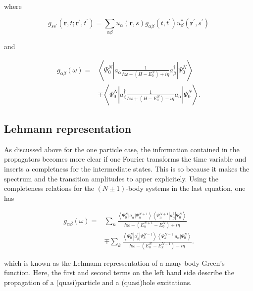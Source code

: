 {{where

$$
g_{s s^{\prime}}\left(\mathbf{r}, t ; \mathbf{r}^{\prime}, t^{\prime}\right)=\sum_{\alpha \beta} u_{\alpha}(\mathbf{r}, s) g_{\alpha \beta}\left(t, t^{\prime}\right) u_{\beta}^{*}\left(\mathbf{r}^{\prime}, s^{\prime}\right)
$$

and

$$
\begin{aligned}
g_{\alpha \beta}(\omega)= & \left\langle\Psi_{0}^{N}\left|a_{\alpha} \frac{1}{\hbar \omega-\left(H-E_{0}^{N}\right)+i \eta} a_{\beta}^{\dagger}\right| \Psi_{0}^{N}\right\rangle \\
& \mp\left\langle\Psi_{0}^{N}\left|a_{\beta}^{\dagger} \frac{1}{\hbar \omega+\left(H-E_{0}^{N}\right)-i \eta} a_{\alpha}\right| \Psi_{0}^{N}\right\rangle .
\end{aligned}
$$

\subsection{Lehmann representation}

As discussed above for the one particle case, the information
contained in the propagators becomes more clear if one Fourier
transforms the time variable and inserts a completness for the
intermediate states. This is so because it makes the spectrum and the
transition amplitudes to apper explicitely. Using the completeness
relations for the $(N \pm 1)$-body systems in the last equation, one has

$$
\begin{aligned}
g_{\alpha \beta}(\omega)= & \sum_{n} \frac{\left\langle\Psi_{0}^{N}\left|a_{\alpha}\right| \Psi_{n}^{N+1}\right\rangle\left\langle\Psi_{n}^{N+1}\left|a_{\beta}^{\dagger}\right| \Psi_{0}^{N}\right\rangle}{\hbar \omega-\left(E_{n}^{N+1}-E_{0}^{N}\right)+i \eta} \\
& \mp \sum_{k} \frac{\left\langle\Psi_{0}^{N}\left|a_{\beta}^{\dagger}\right| \Psi_{k}^{N-1}\right\rangle\left\langle\Psi_{k}^{N-1}\left|a_{\alpha}\right| \Psi_{0}^{N}\right\rangle}{\hbar \omega-\left(E_{0}^{N}-E_{k}^{N-1}\right)-i \eta} .
\end{aligned}
$$

which is known as the Lehmann repressentation of a many-body Green's
function. Here, the first and second terms on the left hand
side describe the propagation of a (quasi)particle and a (quasi)hole
excitations.


}}

